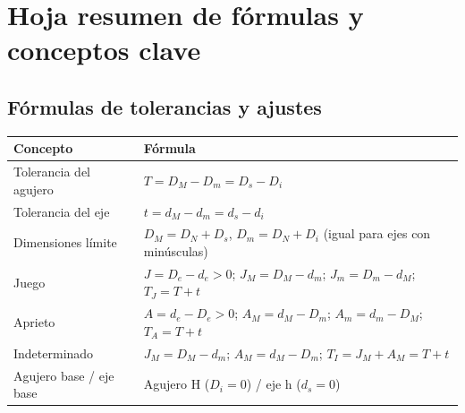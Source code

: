 \documentclass[12pt,a4paper]{article}
\begin{document}
\newpage
\section{Hoja resumen de fórmulas y conceptos clave}

\subsection{Fórmulas de tolerancias y ajustes}
\begin{center}
	\small
	\begin{tabular}{@{}ll@{}}
		\toprule
		\textbf{Concepto}       & \textbf{Fórmula}
		\\
		\midrule
		Tolerancia del agujero  & $T = D_M - D_m = D_s - D_i$
		\\
		Tolerancia del eje      & $t = d_M - d_m = d_s - d_i$
		\\
		Dimensiones límite      & $D_M = D_N + D_s$, $D_m = D_N + D_i$ (igual para
		ejes con minúsculas)
		\\
		Juego                   & $J = D_e - d_e > 0$; $J_M = D_M - d_m$; $J_m = D_m
			                                                                  - d_M$;
		$T_J = T + t$
		\\
		Aprieto                 & $A = d_e - D_e > 0$; $A_M = d_M - D_m$; $A_m = d_m
			                                                                  - D_M$;
		$T_A = T + t$
		\\
		Indeterminado           & $J_M = D_M - d_m$; $A_M = d_M - D_m$; $T_I = J_M +
			                                                                A_M = T +
			                                                                t$ \\
		Agujero base / eje base & Agujero H ($D_i = 0$) / eje h ($d_s = 0$)
		\\
		\bottomrule
	\end{tabular}
\end{center}
\end{document}
